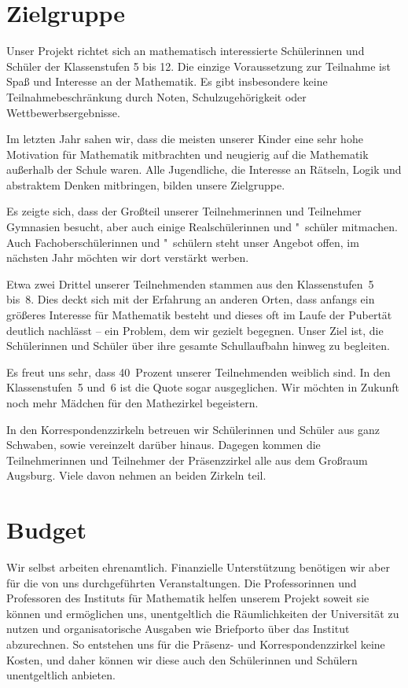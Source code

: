 \documentclass[12pt]{zettel}
\begin{document}
\section{Zielgruppe}

Unser Projekt richtet sich an mathematisch interessierte Schülerinnen
und Schüler der Klassenstufen 5 bis 12. Die einzige Voraussetzung zur
Teilnahme ist Spaß und Interesse an der Mathematik. Es gibt insbesondere
keine Teilnahmebeschränkung durch Noten, Schulzugehörigkeit oder
Wettbewerbsergebnisse.

Im letzten Jahr sahen wir, dass die meisten unserer Kinder eine
sehr hohe Motivation für Mathematik mitbrachten und neugierig auf die
Mathematik außerhalb der Schule waren. Alle Jugendliche, die Interesse an
Rätseln, Logik und abstraktem Denken mitbringen, bilden unsere
Zielgruppe.

Es zeigte sich, dass der Großteil unserer Teilnehmerinnen und
Teilnehmer Gymnasien besucht, aber auch einige Realschülerinnen und "~schüler mitmachen.
Auch Fachoberschülerinnen und "~schülern steht unser Angebot offen, im nächsten
Jahr möchten wir dort verstärkt werben.

Etwa zwei Drittel unserer Teilnehmenden
stammen aus den Klassenstufen~5 bis~8.
Dies deckt sich mit der
Erfahrung an anderen Orten, dass anfangs ein größeres Interesse für
Mathematik besteht und dieses oft im Laufe der Pubertät
deutlich nachlässt -- ein Problem, dem wir gezielt begegnen. Unser Ziel ist, die Schülerinnen und Schüler über ihre gesamte Schullaufbahn hinweg zu begleiten.

Es freut uns sehr, dass 40~Prozent unserer Teilnehmenden weiblich sind. In den Klassenstufen~5 und~6 ist die Quote sogar ausgeglichen. Wir möchten in Zukunft noch mehr Mädchen für den Mathezirkel begeistern.

In den Korrespondenzzirkeln betreuen wir Schülerinnen und Schüler aus ganz
Schwaben, sowie vereinzelt darüber hinaus. Dagegen kommen die Teilnehmerinnen
und Teilnehmer der Präsenzzirkel alle aus dem Großraum Augsburg. Viele davon
nehmen an beiden Zirkeln teil.


\section{Budget}

Wir selbst arbeiten ehrenamtlich. Finanzielle Unterstützung benötigen wir aber
für die von uns durchgeführten Veranstaltungen. Die Professorinnen und
Professoren des Instituts für Mathematik helfen unserem Projekt soweit sie können
und ermöglichen uns, unentgeltlich die Räumlichkeiten der Universität zu nutzen
und organisatorische Ausgaben wie Briefporto über das Institut abzurechnen.
So entstehen uns für die Präsenz- und Korrespondenzzirkel keine Kosten, und
daher können wir diese auch den Schülerinnen und Schülern unentgeltlich
anbieten.
\end{document}
